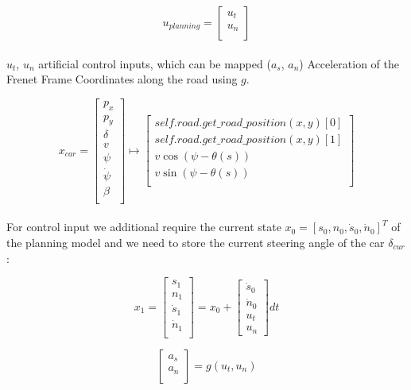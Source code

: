 \[
	u_{planning} = \begin{bmatrix}
		u_t \\
		u_n \\
	\end{bmatrix}
\]
\\
$u_t$, $u_n$ artificial control inputs, which can be mapped ($a_{s}$, $a_{n}$) Acceleration of the Frenet Frame Coordinates along the road using $g$.

\[
	x_{car} = \begin{bmatrix}
		p_x        \\
		p_y        \\
		\delta     \\
		v          \\
		\psi       \\
		\dot{\psi} \\
		\beta      \\
	\end{bmatrix} \mapsto \begin{bmatrix}
		self.road.get\_road\_position(x, y)[0] \\
		self.road.get\_road\_position(x, y)[1] \\
		v \cos(\psi - \theta(s))               \\
		v \sin(\psi - \theta(s))               \\
	\end{bmatrix}
\]
\\
For control input we additional require the current state $x_0 = [s_0, n_0, \dot{s}_0, \dot{n}_0]^T$ of the planning model and we need to store the current steering angle of the car $\delta_{cur}$:

\[
	x_1 = \begin{bmatrix}
		s_1 \\ n_1 \\ \dot{s}_1 \\ \dot{n}_1 \\
	\end{bmatrix} = x_0 + \begin{bmatrix}
		\dot{s}_0 \\ \dot{n}_0 \\ u_t \\ u_n
	\end{bmatrix} dt
\]

\[
	\begin{bmatrix}
		a_s \\
		a_n \\
	\end{bmatrix} = g(u_t, u_n)
\]

